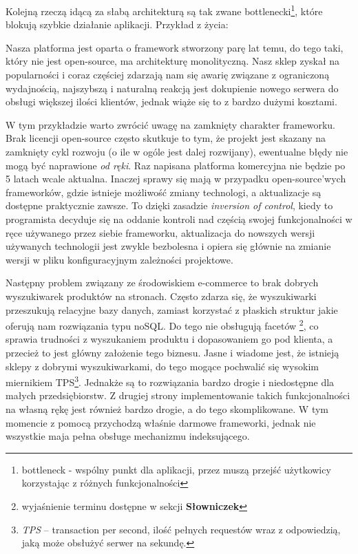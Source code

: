 Kolejną rzeczą idącą za słabą architekturą są tak zwane bottlenecki\footnote{bottleneck - wspólny punkt dla aplikacji, przez muszą przejść użytkowicy korzystając z różnych funkcjonalności}, które blokują szybkie działanie aplikacji. Przykład z życia: 
\begin{example}
	Nasza platforma jest oparta o framework stworzony parę lat temu, do tego taki, który nie jest open-source, ma architekturę monolityczną. Nasz sklep zyskał na popularności i coraz częściej zdarzają nam się awarię związane z ograniczoną wydajnością, najszybszą i naturalną reakcją jest dokupienie nowego serwera do obsługi większej ilości klientów, jednak wiąże się to z bardzo dużymi kosztami.
\end{example} 
W tym przykładzie warto zwrócić uwagę na zamknięty charakter frameworku. Brak licencji open-source często skutkuje to tym, że projekt jest skazany na zamknięty cykl rozwoju (o ile w ogóle jest dalej rozwijany), ewentualne błędy nie mogą być naprawione \textit{od ręki}. Raz napisana platforma komercyjna nie będzie po 5 latach wcale aktualna. Inaczej sprawy się mają w przypadku open-source'wych frameworków, gdzie istnieje możliwość zmiany technologi, a aktualizacje są dostępne praktycznie zawsze. To dzięki zasadzie \textit{inversion of control}, kiedy to programista decyduje się na oddanie kontroli nad częścią swojej funkcjonalności w ręce używanego przez siebie frameworku, aktualizacja do nowszych wersji używanych technologii jest zwykle bezbolesna i opiera się głównie na zmianie wersji w pliku konfiguracyjnym zależności projektowe.

Następny problem związany ze środowiskiem e-commerce to brak dobrych wyszukiwarek produktów na stronach. Często zdarza się, że wyszukiwarki przeszukują relacyjne bazy danych, zamiast korzystać z płaskich struktur jakie oferują nam rozwiązania typu noSQL. Do tego nie obsługują facetów \footnote{wyjaśnienie terminu dostępne w sekcji \textbf{Słowniczek}}, co sprawia trudności z wyszukaniem produktu i dopasowaniem go pod klienta, a przecież to jest główny założenie tego biznesu. Jasne i wiadome jest, że istnieją sklepy z dobrymi wyszukiwarkami, do tego mogące pochwalić się wysokim miernikiem TPS\footnote{\textit{TPS} -- transaction per second, ilość pełnych requestów wraz z odpowiedzią, jaką może obsłużyć serwer na sekundę.}. Jednakże są to rozwiązania bardzo drogie i niedostępne dla małych przedsiębiorstw. Z drugiej strony implementowanie takich funkcjonalności na własną rękę jest również bardzo drogie, a do tego skomplikowane. W tym momencie z pomocą przychodzą właśnie darmowe frameworki, jednak nie wszystkie maja pełna obsługe mechanizmu indeksującego.

